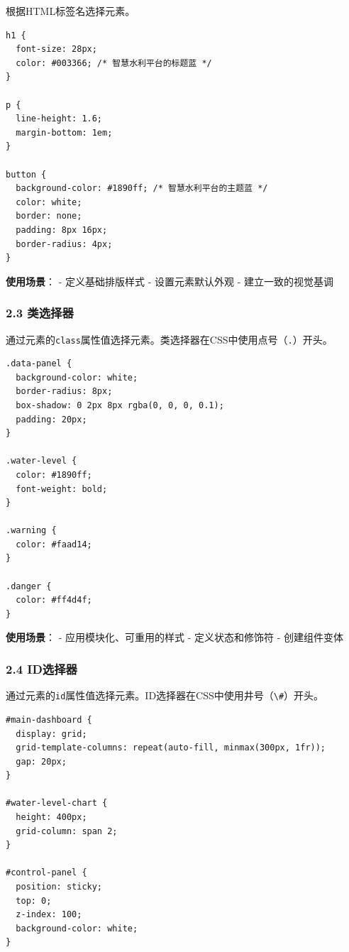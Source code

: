 根据HTML标签名选择元素。

\begin{lstlisting}
h1 {
  font-size: 28px;
  color: #003366; /* 智慧水利平台的标题蓝 */
}

p {
  line-height: 1.6;
  margin-bottom: 1em;
}

button {
  background-color: #1890ff; /* 智慧水利平台的主题蓝 */
  color: white;
  border: none;
  padding: 8px 16px;
  border-radius: 4px;
}
\end{lstlisting}

\textbf{使用场景}： - 定义基础排版样式 - 设置元素默认外观 -
建立一致的视觉基调

\subsubsection{2.3 类选择器}\label{ux7c7bux9009ux62e9ux5668}

通过元素的\passthrough{\lstinline!class!}属性值选择元素。类选择器在CSS中使用点号（\passthrough{\lstinline!.!}）开头。

\begin{lstlisting}
.data-panel {
  background-color: white;
  border-radius: 8px;
  box-shadow: 0 2px 8px rgba(0, 0, 0, 0.1);
  padding: 20px;
}

.water-level {
  color: #1890ff;
  font-weight: bold;
}

.warning {
  color: #faad14;
}

.danger {
  color: #ff4d4f;
}
\end{lstlisting}

\textbf{使用场景}： - 应用模块化、可重用的样式 - 定义状态和修饰符 -
创建组件变体

\subsubsection{2.4 ID选择器}\label{idux9009ux62e9ux5668}

通过元素的\passthrough{\lstinline!id!}属性值选择元素。ID选择器在CSS中使用井号（\passthrough{\lstinline!\#!}）开头。

\begin{lstlisting}
#main-dashboard {
  display: grid;
  grid-template-columns: repeat(auto-fill, minmax(300px, 1fr));
  gap: 20px;
}

#water-level-chart {
  height: 400px;
  grid-column: span 2;
}

#control-panel {
  position: sticky;
  top: 0;
  z-index: 100;
  background-color: white;
}
\end{lstlisting}

